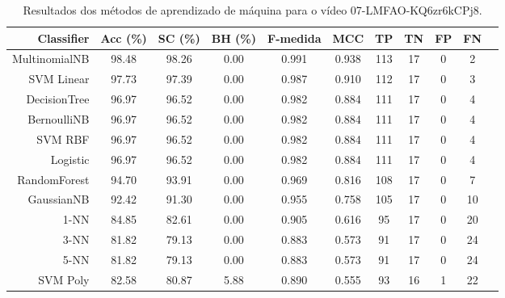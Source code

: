 \begin{table}[!htb]
\centering
\caption{Resultados dos métodos de aprendizado de máquina para o vídeo 07-LMFAO-KQ6zr6kCPj8.}
\label{tab:07-LMFAO-KQ6zr6kCPj8}
\begin{tabular}{r|c|c|c|c|c|c|c|c|c|c}
\hline\hline
Classifier & Acc (\%) & SC (\%) & BH (\%) & F-medida & MCC & TP & TN & FP & FN \\ \hline
MultinomialNB & 98.48 & 98.26 & 0.00 & 0.991 & 0.938 & 113 & 17 & 0 & 2 \\ 
SVM Linear & 97.73 & 97.39 & 0.00 & 0.987 & 0.910 & 112 & 17 & 0 & 3 \\ 
DecisionTree & 96.97 & 96.52 & 0.00 & 0.982 & 0.884 & 111 & 17 & 0 & 4 \\ 
BernoulliNB & 96.97 & 96.52 & 0.00 & 0.982 & 0.884 & 111 & 17 & 0 & 4 \\ 
SVM RBF & 96.97 & 96.52 & 0.00 & 0.982 & 0.884 & 111 & 17 & 0 & 4 \\ 
Logistic & 96.97 & 96.52 & 0.00 & 0.982 & 0.884 & 111 & 17 & 0 & 4 \\ 
RandomForest & 94.70 & 93.91 & 0.00 & 0.969 & 0.816 & 108 & 17 & 0 & 7 \\ 
GaussianNB & 92.42 & 91.30 & 0.00 & 0.955 & 0.758 & 105 & 17 & 0 & 10 \\ 
1-NN & 84.85 & 82.61 & 0.00 & 0.905 & 0.616 & 95 & 17 & 0 & 20 \\ 
3-NN & 81.82 & 79.13 & 0.00 & 0.883 & 0.573 & 91 & 17 & 0 & 24 \\ 
5-NN & 81.82 & 79.13 & 0.00 & 0.883 & 0.573 & 91 & 17 & 0 & 24 \\ 
SVM Poly & 82.58 & 80.87 & 5.88 & 0.890 & 0.555 & 93 & 16 & 1 & 22 \\ 
\hline\hline
\end{tabular}
\end{table}
